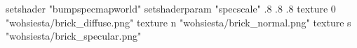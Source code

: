 setshader "bumpspecmapworld"
setshaderparam "specscale" .8 .8 .8
texture 0 "wohsiesta/brick_diffuse.png"
texture n "wohsiesta/brick_normal.png"
texture s "wohsiesta/brick_specular.png"